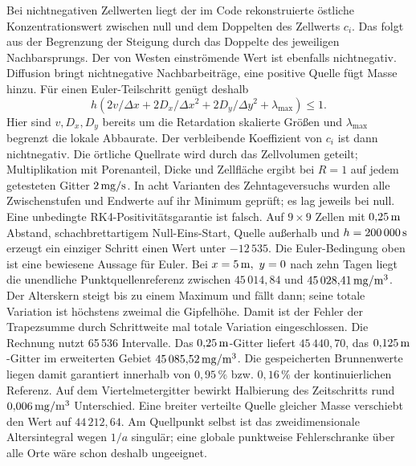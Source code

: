 Bei nichtnegativen Zellwerten liegt der im Code rekonstruierte östliche Konzentrationswert zwischen null und dem Doppelten des Zellwerts \(c_i\). Das folgt aus der Begrenzung der Steigung durch das Doppelte des jeweiligen Nachbarsprungs. Der von Westen einströmende Wert ist ebenfalls nichtnegativ. Diffusion bringt nichtnegative Nachbarbeiträge, eine positive Quelle fügt Masse hinzu. Für einen Euler-Teilschritt genügt deshalb
\[
 h\left(2v/\Delta x+2D_x/\Delta x^2+2D_y/\Delta y^2+
 \lambda_{\max}\right)\le 1.
\]
Hier sind \(v,D_x,D_y\) bereits um die Retardation skalierte Größen und \(\lambda_{\max}\) begrenzt die lokale Abbaurate. Der verbleibende Koeffizient von \(c_i\) ist dann nichtnegativ. Die örtliche Quellrate wird durch das Zellvolumen geteilt; Multiplikation mit Porenanteil, Dicke und Zellfläche ergibt bei \(R=1\) auf jedem getesteten Gitter \(2\,\mathrm{mg/s}\).
In acht Varianten des Zehntageversuchs wurden alle Zwischenstufen und Endwerte auf ihr Minimum geprüft; es lag jeweils bei null. Eine unbedingte RK4-Positivitätsgarantie ist falsch. Auf \(9\times9\) Zellen mit \(0{,}25\,\mathrm{m}\) Abstand, schachbrettartigem Null-Eins-Start, Quelle außerhalb und \(h=200\,000\,\mathrm{s}\) erzeugt ein einziger Schritt einen Wert unter \(-12\,535\). Die Euler-Bedingung oben ist eine bewiesene Aussage für Euler.
Bei \(x=5\,\mathrm{m},\ y=0\) nach zehn Tagen liegt die unendliche Punktquellenreferenz zwischen \(45\,014{,}84\) und \(45\,028{,}41\,\mathrm{mg/m^3}\). Der Alterskern steigt bis zu einem Maximum und fällt dann; seine totale Variation ist höchstens zweimal die Gipfelhöhe. Damit ist der Fehler der Trapezsumme durch Schrittweite mal totale Variation eingeschlossen. Die Rechnung nutzt 65\,536 Intervalle.
Das \(0{,}25\,\mathrm{m}\)-Gitter liefert \(45\,440{,}70\), das \(0{,}125\,\mathrm{m}\)-Gitter im erweiterten Gebiet \(45\,085{,}52\,\mathrm{mg/m^3}\). Die gespeicherten Brunnenwerte liegen damit garantiert innerhalb von \(0{,}95\,\%\) bzw. \(0{,}16\,\%\) der kontinuierlichen Referenz. Auf dem Viertelmetergitter bewirkt Halbierung des Zeitschritts rund \(0{,}006\,\mathrm{mg/m^3}\) Unterschied. Eine breiter verteilte Quelle gleicher Masse verschiebt den Wert auf \(44\,212{,}64\). Am Quellpunkt selbst ist das zweidimensionale Altersintegral wegen \(1/a\) singulär; eine globale punktweise Fehlerschranke über alle Orte wäre schon deshalb ungeeignet.


